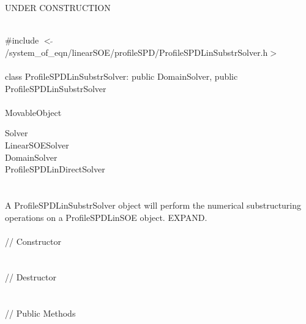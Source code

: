 
UNDER CONSTRUCTION

   \\
\indent \#include $<\tilde{
}$/system\_of\_eqn/linearSOE/profileSPD/ProfileSPDLinSubstrSolver.h$>$ \\ 

  \\
\indent class ProfileSPDLinSubstrSolver: public DomainSolver, public
ProfileSPDLinSubstrSolver  \\ 

 \\
 MovableObject 

\indent\indent  Solver \\
\indent\indent\indent  LinearSOESolver \\
\indent\indent\indent\indent  DomainSolver \\
\indent\indent\indent\indent  ProfileSPDLinDirectSolver \\
\indent\indent\indent\indent{} \\

  \\
\indent A ProfileSPDLinSubstrSolver object will perform the numerical
substructuring operations on a ProfileSPDLinSOE object. EXPAND. \\

  \\
\indent\indent // Constructor  \\
\indent{}  \\ \\
\indent\indent // Destructor  \\
\indent{}\\ \\
\indent\indent // Public Methods \\
\indent{} \\
\indent{} \\
\indent{} \\
\indent{} \\
\indent{} \\
\indent{} \\
\indent{} \\
\indent{} \\






